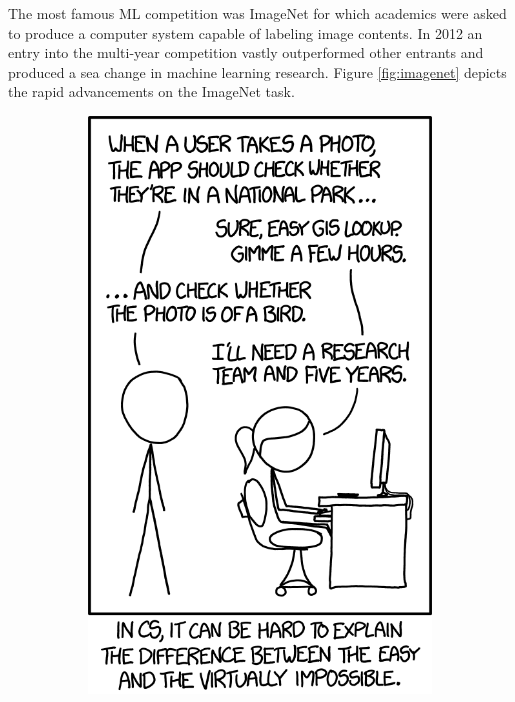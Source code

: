 The most famous ML competition was ImageNet \cite{deng_imagenet_2009} for which academics were asked to produce a computer system capable of labeling image contents. In 2012 an entry into the multi-year competition vastly outperformed other entrants and produced a sea change in machine learning research. Figure \ref{fig:imagenet} depicts the rapid advancements on the ImageNet task.

\begin{figure}
     \centering
     \begin{subfigure}[b]{0.23\textwidth}
         \centering
         \includegraphics[width=\textwidth]{images/xkcd.png}

\end{subfigure}
\end{figure}
